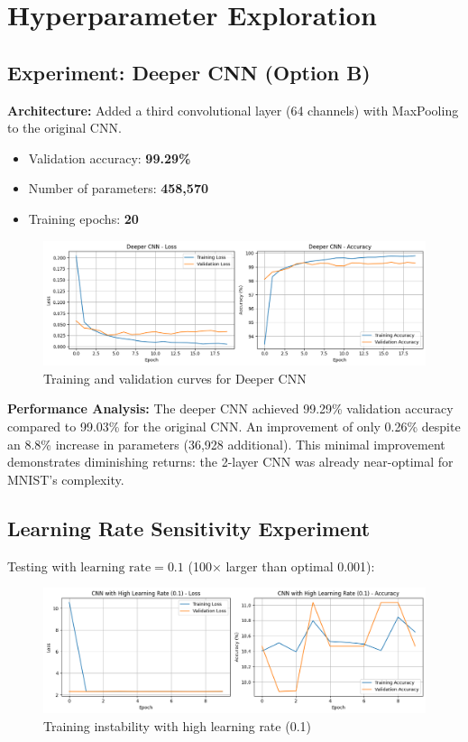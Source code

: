 \section{Hyperparameter Exploration}

\subsection{Experiment: Deeper CNN (Option B)}

\textbf{Architecture:} Added a third convolutional layer (64 channels) with MaxPooling to the original CNN.

\begin{itemize}
    \item Validation accuracy: \textbf{99.29\%}
    \item Number of parameters: \textbf{458,570}
    \item Training epochs: \textbf{20}
\end{itemize}

\begin{figure}[h]
    \centering
    \includegraphics[width=0.7\linewidth]{section4/deeper_cnn.png}
    \caption{Training and validation curves for Deeper CNN}
    \label{fig:deeper-cnn}
\end{figure}

\textbf{Performance Analysis:} The deeper CNN achieved 99.29\% validation accuracy compared to 99.03\% for the original CNN. An improvement of only 0.26\% despite an 8.8\% increase in parameters (36,928 additional). This minimal improvement demonstrates diminishing returns: the 2-layer CNN was already near-optimal for MNIST's complexity.

\subsection{Learning Rate Sensitivity Experiment}

Testing with $\text{learning rate} = 0.1$ (100× larger than optimal 0.001):

\begin{figure}[h]
    \centering
    \includegraphics[width=0.7\linewidth]{section4/high_lr.png}
    \caption{Training instability with high learning rate (0.1)}
    \label{fig:high-lr}
\end{figure}

